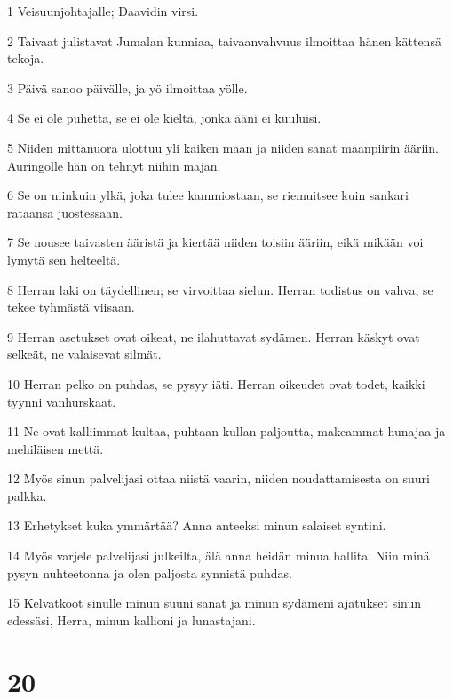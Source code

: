 \par 1 Veisuunjohtajalle; Daavidin virsi.
\par 2 Taivaat julistavat Jumalan kunniaa, taivaanvahvuus ilmoittaa hänen kättensä tekoja.
\par 3 Päivä sanoo päivälle, ja yö ilmoittaa yölle.
\par 4 Se ei ole puhetta, se ei ole kieltä, jonka ääni ei kuuluisi.
\par 5 Niiden mittanuora ulottuu yli kaiken maan ja niiden sanat maanpiirin ääriin. Auringolle hän on tehnyt niihin majan.
\par 6 Se on niinkuin ylkä, joka tulee kammiostaan, se riemuitsee kuin sankari rataansa juostessaan.
\par 7 Se nousee taivasten ääristä ja kiertää niiden toisiin ääriin, eikä mikään voi lymytä sen helteeltä.
\par 8 Herran laki on täydellinen; se virvoittaa sielun. Herran todistus on vahva, se tekee tyhmästä viisaan.
\par 9 Herran asetukset ovat oikeat, ne ilahuttavat sydämen. Herran käskyt ovat selkeät, ne valaisevat silmät.
\par 10 Herran pelko on puhdas, se pysyy iäti. Herran oikeudet ovat todet, kaikki tyynni vanhurskaat.
\par 11 Ne ovat kalliimmat kultaa, puhtaan kullan paljoutta, makeammat hunajaa ja mehiläisen mettä.
\par 12 Myös sinun palvelijasi ottaa niistä vaarin, niiden noudattamisesta on suuri palkka.
\par 13 Erhetykset kuka ymmärtää? Anna anteeksi minun salaiset syntini.
\par 14 Myös varjele palvelijasi julkeilta, älä anna heidän minua hallita. Niin minä pysyn nuhteetonna ja olen paljosta synnistä puhdas.
\par 15 Kelvatkoot sinulle minun suuni sanat ja minun sydämeni ajatukset sinun edessäsi, Herra, minun kallioni ja lunastajani.

\chapter{20}

